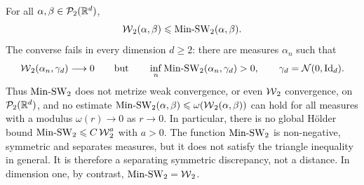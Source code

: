\begin{prop}\label{prop-min-sw-comparison}
For all $\alpha,\beta\in\mathcal{P}_2(\mathbb{R}^d)$,
\begin{equation}\label{eq-min-sw-comparison}
\operatorname{\mathcal{W}}_2(\alpha,\beta)
\leqslant
\operatorname{Min\text{-}SW}_2(\alpha,\beta).
\end{equation}
The converse fails in every dimension $d\geq2$: there are measures $\alpha_n$ such that
\begin{equation}\label{eq-min-sw-topological-counterexample}
\operatorname{\mathcal{W}}_2(\alpha_n,\gamma_d)\longrightarrow0
\qquad\text{but}\qquad
\inf_n\operatorname{Min\text{-}SW}_2(\alpha_n,\gamma_d)>0,
\qquad
\gamma_d=\mathcal{N}(0,\mathrm{Id}_d).
\end{equation}
Thus $\operatorname{Min\text{-}SW}_2$ does not metrize weak convergence, or even $\operatorname{\mathcal{W}}_2$ convergence, on $\mathcal{P}_2(\mathbb{R}^d)$, and no estimate
$\operatorname{Min\text{-}SW}_2(\alpha,\beta)\leqslant\omega(\operatorname{\mathcal{W}}_2(\alpha,\beta))$ can hold for all measures with a modulus $\omega(r)\to0$ as $r\to0$. In particular, there is no global H\"older bound $\operatorname{Min\text{-}SW}_2\leqslant C\operatorname{\mathcal{W}}_2^a$ with $a>0$.
The function $\operatorname{Min\text{-}SW}_2$ is non-negative, symmetric and separates measures, but it does not satisfy the triangle inequality in general. It is therefore a separating symmetric discrepancy, not a distance. In dimension one, by contrast, $\operatorname{Min\text{-}SW}_2=\operatorname{\mathcal{W}}_2$.
\end{prop}
